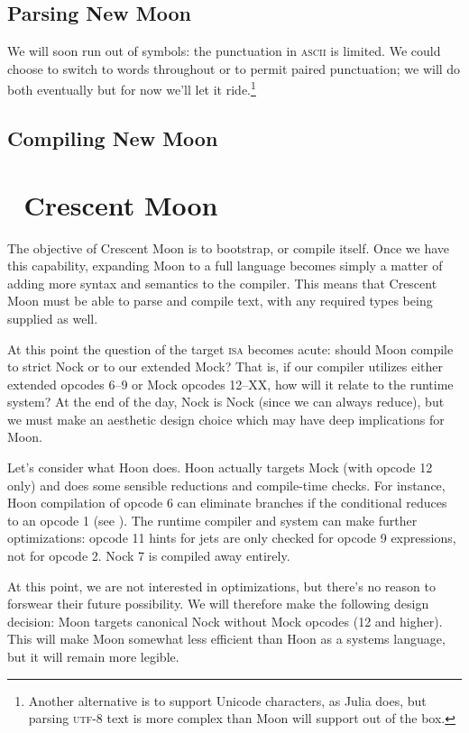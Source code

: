 \subsection{Parsing New Moon}

We will soon run out of symbols:  the punctuation in \textsc{ascii} is limited.  We could choose to switch to words throughout or to permit paired punctuation; we will do both eventually but for now we'll let it ride.\footnote{Another alternative is to support Unicode characters, as Julia does, but parsing \textsc{utf}-8 text is more complex than Moon will support out of the box.}


\subsection{Compiling New Moon}


\section{\textrm{🌙} Crescent Moon}

The objective of Crescent Moon is to bootstrap, or compile itself.  Once we have this capability, expanding Moon to a full language becomes simply a matter of adding more syntax and semantics to the compiler.  This means that Crescent Moon must be able to parse and compile text, with any required types being supplied as well.



At this point the question of the target \textsc{isa} becomes acute:  should Moon compile to strict Nock or to our extended Mock?  That is, if our compiler utilizes either extended opcodes 6--9 or Mock opcodes 12--XX, how will it relate to the runtime system?  At the end of the day, Nock is Nock (since we can always reduce), but we must make an aesthetic design choice which may have deep implications for Moon.

Let's consider what Hoon does.  Hoon actually targets Mock (with opcode 12 only) and does some sensible reductions and compile-time checks.  For instance, Hoon compilation of opcode 6 can eliminate branches if the conditional reduces to an opcode 1 (see ).  The runtime compiler and system can make further optimizations:  opcode 11  hints for jets are only checked for opcode 9 expressions, not for opcode 2.  Nock 7 is compiled away entirely.

At this point, we are not interested in optimizations, but there's no reason to forswear their future possibility.  We will therefore make the following design decision:  Moon targets canonical Nock without Mock opcodes (12 and higher).  This will make Moon somewhat less efficient than Hoon as a systems language, but it will remain more legible.



